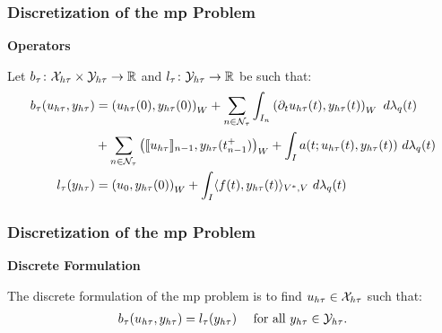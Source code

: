 \begin{frame}
    \frametitle{Discretization of the \acrshort{mp} Problem}

    \vspace*{\fill}
    \begin{center}
        {\color{\accentcolor} \Large \textbf{Operators}}
        \vspace*{0.25cm}

        \begin{minipage}{0.75\textwidth}
            \begin{definition}
                Let $b_{\tau} \colon \mathcal{X}_{h \tau} \times \mathcal{Y}_{h \tau} \rightarrow \mathbb{R}$ and $l_{\tau} \colon \mathcal{Y}_{h \tau} \rightarrow \mathbb{R}$ be such that:
                \begin{align*}
                    b_{\tau}(u_{h \tau}, y_{h \tau}) & = \left( u_{h \tau}(0), y_{h \tau}(0) \right)_W + \sum_{n \in \mathcal{N}_{\tau}} \int_{I_n} \left( \partial_t u_{h \tau}(t), y_{h \tau}(t) \right)_W ~ d \lambda_q(t) \\
                    & + \sum_{n \in \mathcal{N}_{\tau}} \left( \llbracket u_{h \tau} \rrbracket_{n - 1}, y_{h \tau}(t_{n - 1}^+) \right)_W + \int_I a(t; u_{h \tau}(t), y_{h \tau}(t)) ~ d \lambda_q(t) \\
                    l_{\tau}(y_{h \tau}) & = \left( u_0, y_{h \tau}(0) \right)_W + \int_I \langle f(t), y_{h \tau}(t) \rangle_{V^*, V} ~ d \lambda_q(t)
                \end{align*}
            \end{definition}
        \end{minipage}
    \end{center}
    \vspace*{\fill}
    
\end{frame}

\begin{frame}
    \frametitle{Discretization of the \acrshort{mp} Problem}

    \vspace*{\fill}
    \begin{center}
        {\color{\accentcolor} \Large \textbf{Discrete Formulation}}
        \vspace*{0.25cm}

        \begin{minipage}{0.75\textwidth}
            \begin{definition}
                The discrete formulation of the \acrshort{mp} problem is to find $u_{h \tau} \in \mathcal{X}_{h \tau}$ such that:
                \begin{align*}
                    b_{\tau}(u_{h \tau}, y_{h \tau}) &= l_{\tau}(y_{h \tau}) &\text{ for all } y_{h \tau} \in \mathcal{Y}_{h \tau}.
                \end{align*}
            \end{definition}
        \end{minipage}
    \end{center}
    \vspace*{\fill}
    
\end{frame}

